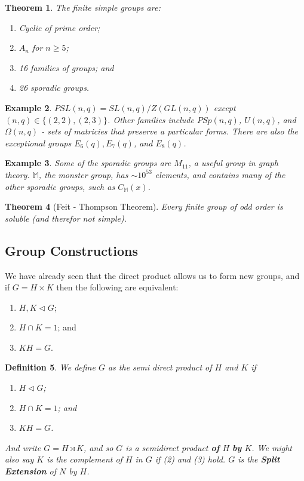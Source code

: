 \documentclass[a4paper,10pt]{article}
\newtheorem{thm}{Theorem}
\newtheorem{Def}[thm]{Definition}
\newtheorem{eg}[thm]{Example}
\begin{document}
\begin{thm}
The finite simple groups are:
\begin{enumerate}
\item Cyclic of prime order;
\item $A_n$ for $n \geq 5$; 
\item 16 families of groups; and
\item 26 sporadic groups.
\end{enumerate}
\end{thm}

\begin{eg}
$PSL(n,q) = SL(n,q) / Z(GL(n,q))$ except $(n,q) \in  \{(2,2), (2,3)\}$. Other families include $PSp(n,q)$, $U(n,q)$, and $\Omega(n,q)$ - sets of matricies that preserve a particular forms. There are also the exceptional groups $E_6(q), E_7(q)$, and $E_8(q)$. 
\end{eg}

\begin{eg}
Some of the sporadic groups are $M_{11}$, a useful group in graph theory. $\mathbb{M}$, the monster group, has $\sim 10^{53}$ elements, and contains many of the other sporadic groups, such as $C_\mathbb{M}(x)$. 
\end{eg}

\begin{thm}[Feit - Thompson Theorem]
Every finite group of odd order is soluble (and therefor not simple).
\end{thm}



\subsection{Group Constructions}

We have already seen that the direct product allows us to form new groups, and if $G = H \times K$ then the following are equivalent:\begin{enumerate}
\item $H, K \triangleleft G$;
\item $H \cap K = 1$; and
\item $KH = G$. 
\end{enumerate}

\begin{Def}
We define $G$ as the semi direct product of $H$ and $K$ if
\begin{enumerate}
\item $H \triangleleft G$;
\item $H \cap K = 1$; and
\item $KH = G$. 
\end{enumerate}
And write $G = H \rtimes K$, and so $G$ is a semidirect product \textbf{of} $H$ \textbf{by} $K$. We might also say $K$ is the complement of $H$ in $G$ if (2) and (3) hold. $G$ is the \textbf{Split Extension} of $N$ by $H$.
\end{Def}
\end{document}
